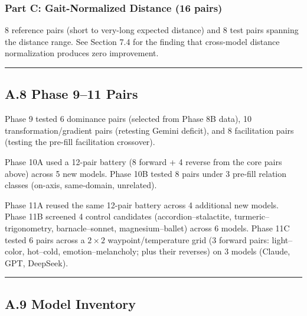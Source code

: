 \subsubsection{Part C: Gait-Normalized Distance (16 pairs)}\label{part-c-gait-normalized-distance-16-pairs}

8 reference pairs (short to very-long expected distance) and 8 test pairs spanning the distance range. See Section 7.4 for the finding that cross-model distance normalization produces zero improvement.

\begin{center}\rule{0.5\linewidth}{0.5pt}\end{center}

\subsection{A.8 Phase 9--11 Pairs}\label{a.8-phase-911-pairs}

Phase 9 tested 6 dominance pairs (selected from Phase 8B data), 10 transformation/gradient pairs (retesting Gemini deficit), and 8 facilitation pairs (testing the pre-fill facilitation crossover).

Phase 10A used a 12-pair battery (8 forward + 4 reverse from the core pairs above) across 5 new models. Phase 10B tested 8 pairs under 3 pre-fill relation classes (on-axis, same-domain, unrelated).

Phase 11A reused the same 12-pair battery across 4 additional new models. Phase 11B screened 4 control candidates (accordion--stalactite, turmeric--trigonometry, barnacle--sonnet, magnesium--ballet) across 6 models. Phase 11C tested 6 pairs across a $2\times 2$ waypoint/temperature grid (3 forward pairs: light--color, hot--cold, emotion--melancholy; plus their reverses) on 3 models (Claude, GPT, DeepSeek).

\begin{center}\rule{0.5\linewidth}{0.5pt}\end{center}

\subsection{A.9 Model Inventory}\label{a.9-model-inventory}

